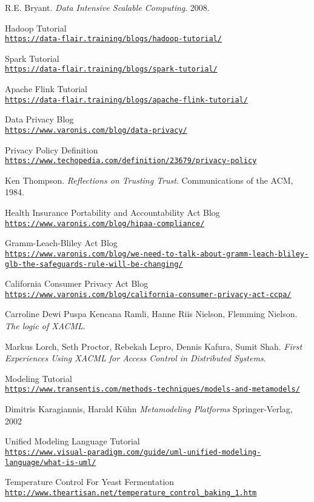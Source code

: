 \begin{thebibliography}{9}
R.E. Bryant.
\textit{Data Intensive Scalable Computing}. 
2008.

Hadoop Tutorial
\\\texttt{\url{https://data-flair.training/blogs/hadoop-tutorial/}}

Spark Tutorial
\\\texttt{\url{https://data-flair.training/blogs/spark-tutorial/}}

Apache Flink Tutorial
\\\texttt{\url{https://data-flair.training/blogs/apache-flink-tutorial/}}

Data Privacy Blog
\\\texttt{\url{https://www.varonis.com/blog/data-privacy/}}

Privacy Policy Definition
\\\texttt{\url{https://www.techopedia.com/definition/23679/privacy-policy}}

Ken Thompson.
\textit{Reflections on Trusting Trust}. 
Communications of the ACM, 1984.

Health Insurance Portability and Accountability Act Blog
\\\texttt{\url{https://www.varonis.com/blog/hipaa-compliance/}}

Gramm-Leach-Bliley Act Blog
\\\texttt{\url{https://www.varonis.com/blog/we-need-to-talk-about-gramm-leach-bliley-glb-the-safeguards-rule-will-be-changing/}}

California Consumer Privacy Act Blog
\\\texttt{\url{https://www.varonis.com/blog/california-consumer-privacy-act-ccpa/}}

Carroline Dewi Puspa Kencana Ramli, Hanne Riis Nielson, Flemming Nielson.
\textit{The logic of XACML}.

Markus Lorch, Seth Proctor, Rebekah Lepro, Dennis Kafura, Sumit Shah.
\textit{First Experiences Using XACML for Access Control in Distributed Systems}.

Modeling Tutorial
\\\texttt{\url{https://www.transentis.com/methods-techniques/models-and-metamodels/}}

Dimitris Karagiannis, Harald Kühn
\textit{Metamodeling Platforms}
Springer-Verlag, 2002

Unified Modeling Language Tutorial
\\\texttt{\url{https://www.visual-paradigm.com/guide/uml-unified-modeling-language/what-is-uml/}}

Temperature Control For Yeast Fermentation
\\\texttt{\url{http://www.theartisan.net/temperature\_control\_baking\_1.htm}}


\end{thebibliography}
